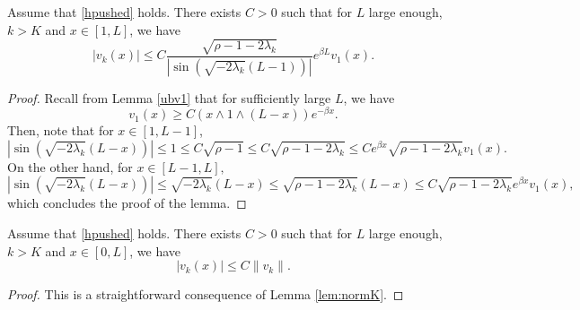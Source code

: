 \documentclass[11pt]{article}
\theoremstyle{plain}
\begin{document}
\begin{appendix}
\begin{lem}
Assume that  \eqref{hpushed} holds. There exists $C>0$ such that for $L$ large enough,  $k>K$ and $x\in[1,L]$, we have 
$$  \left|{v_k(x)}\right|\leqslant C \frac{\sqrt{\rho-1-2\lambda_k}}{|\sin(\sqrt{-2\lambda_k}(L-1))|} e^{\beta L} v_1(x).$$
\end{lem}
\begin{proof}
Recall from Lemma \ref{ubv1} that for sufficiently large $L$, we have 
\begin{equation*}
v_1(x)\geqslant C(x\wedge 1\wedge (L-x))e^{-\beta x}.
\end{equation*}
Then, note that for  $x\in[1,L-1]$,
\begin{equation*}
|\sin(\sqrt{-2\lambda_k}(L-x))|\leqslant 1\leqslant C\sqrt{\rho-1}\leqslant C\sqrt{\rho-1-2\lambda_k}\leqslant Ce^{\beta x}\sqrt{\rho-1-2\lambda_k}v_1(x).
\end{equation*}
On the other hand, for $x\in[L-1,L],$
\begin{equation*}
|\sin(\sqrt{-2\lambda_k}(L-x))|\leqslant \sqrt{-2\lambda_k}(L-x)\leqslant \sqrt{\rho-1-2\lambda_k}(L-x)\leqslant C\sqrt{\rho-1-2\lambda_k}e^{\beta x}v_1(x),
\end{equation*} 
which concludes the proof of the lemma.
\end{proof}
\begin{lem}
Assume that \eqref{hpushed} holds. There exists $C>0$ such that for $L$ large enough, $k>K$ and $x\in[0,L]$, we have 
$$  \left|{v_k(x)}\right|\leqslant C \|v_k\|.$$
\end{lem}
\begin{proof}
This is a straightforward consequence of Lemma \ref{lem:normK}.
\end{proof}

\end{appendix}
\end{document}
